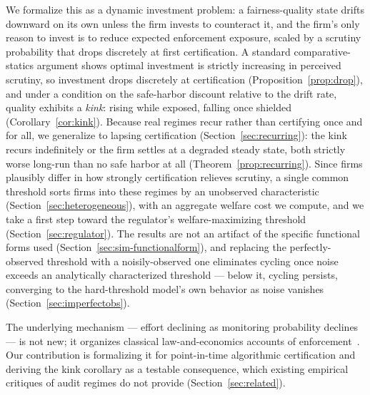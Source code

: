 We formalize this as a dynamic investment problem: a fairness-quality state drifts downward on its own unless the firm invests to counteract it, and the firm's only reason to invest is to reduce expected enforcement exposure, scaled by a scrutiny probability that drops discretely at first certification. A standard comparative-statics argument shows optimal investment is strictly increasing in perceived scrutiny, so investment drops discretely at certification (Proposition~\ref{prop:drop}), and under a condition on the safe-harbor discount relative to the drift rate, quality exhibits a \emph{kink}: rising while exposed, falling once shielded (Corollary~\ref{cor:kink}). Because real regimes recur rather than certifying once and for all, we generalize to lapsing certification (Section~\ref{sec:recurring}): the kink recurs indefinitely or the firm settles at a degraded steady state, both strictly worse long-run than no safe harbor at all (Theorem~\ref{prop:recurring}). Since firms plausibly differ in how strongly certification relieves scrutiny, a single common threshold sorts firms into these regimes by an unobserved characteristic (Section~\ref{sec:heterogeneous}), with an aggregate welfare cost we compute, and we take a first step toward the regulator's welfare-maximizing threshold (Section~\ref{sec:regulator}). The results are not an artifact of the specific functional forms used (Section~\ref{sec:sim-functionalform}), and replacing the perfectly-observed threshold with a noisily-observed one eliminates cycling once noise exceeds an analytically characterized threshold — below it, cycling persists, converging to the hard-threshold model's own behavior as noise vanishes (Section~\ref{sec:imperfectobs}).

The underlying mechanism — effort declining as monitoring probability declines — is not new; it organizes classical law-and-economics accounts of enforcement~\cite{becker1968crime,mookherjee1992monitoring}. Our contribution is formalizing it for point-in-time algorithmic certification and deriving the kink corollary as a testable consequence, which existing empirical critiques of audit regimes do not provide (Section~\ref{sec:related}).
